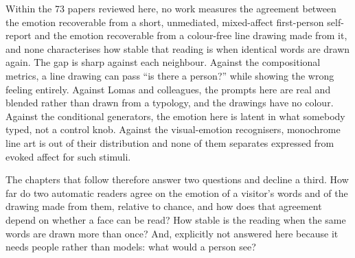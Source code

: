 Within the 73 papers reviewed here, no work measures the agreement between the emotion recoverable from a short, unmediated, mixed-affect first-person self-report and the emotion recoverable from a colour-free line drawing made from it, and none characterises how stable that reading is when identical words are drawn again. The gap is sharp against each neighbour. Against the compositional metrics, a line drawing can pass ``is there a person?'' while showing the wrong feeling entirely. Against Lomas and colleagues, the prompts here are real and blended rather than drawn from a typology, and the drawings have no colour. Against the conditional generators, the emotion here is latent in what somebody typed, not a control knob. Against the visual-emotion recognisers, monochrome line art is out of their distribution and none of them separates expressed from evoked affect for such stimuli.

The chapters that follow therefore answer two questions and decline a third. How far do two automatic readers agree on the emotion of a visitor's words and of the drawing made from them, relative to chance, and how does that agreement depend on whether a face can be read? How stable is the reading when the same words are drawn more than once? And, explicitly not answered here because it needs people rather than models: what would a person see?
